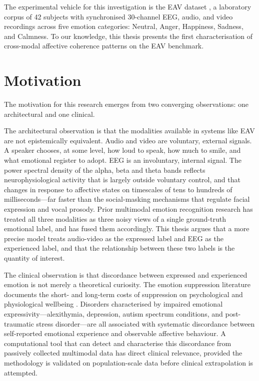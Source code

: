 The experimental vehicle for this investigation is the EAV dataset \cite{Lee2024EAV}, a laboratory corpus of 42 subjects with synchronised 30-channel EEG, audio, and video recordings across five emotion categories: Neutral, Anger, Happiness, Sadness, and Calmness. To our knowledge, this thesis presents the first characterisation of cross-modal affective coherence patterns on the EAV benchmark.

\section{Motivation}
The motivation for this research emerges from two converging observations: one architectural and one clinical.

The architectural observation is that the modalities available in systems like EAV are not epistemically equivalent. Audio and video are voluntary, external signals. A speaker chooses, at some level, how loud to speak, how much to smile, and what emotional register to adopt. EEG is an involuntary, internal signal. The power spectral density of the alpha, beta and theta bands reflects neurophysiological activity that is largely outside voluntary control, and that changes in response to affective states on timescales of tens to hundreds of milliseconds---far faster than the social-masking mechanisms that regulate facial expression and vocal prosody. Prior multimodal emotion recognition research has treated all three modalities as three noisy views of a single ground-truth emotional label, and has fused them accordingly. This thesis argues that a more precise model treats audio-video as the expressed label and EEG as the experienced label, and that the relationship between these two labels is the quantity of interest.

The clinical observation is that discordance between expressed and experienced emotion is not merely a theoretical curiosity. The emotion suppression literature documents the short- and long-term costs of suppression on psychological and physiological wellbeing \cite{Gross1998EmotionRegulation,Mauss2009Measures}. Disorders characterised by impaired emotional expressivity---alexithymia, depression, autism spectrum conditions, and post-traumatic stress disorder---are all associated with systematic discordance between self-reported emotional experience and observable affective behaviour. A computational tool that can detect and characterise this discordance from passively collected multimodal data has direct clinical relevance, provided the methodology is validated on population-scale data before clinical extrapolation is attempted.

